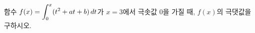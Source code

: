 함수 $f(x)=\displaystyle\int_{0}^{x}(t^2+at+b)\mkern3mu dt$가 $x=3$에서 극솟값 $0$을 가질 때, $f(x)$의 극댓값을 구하시오. 
